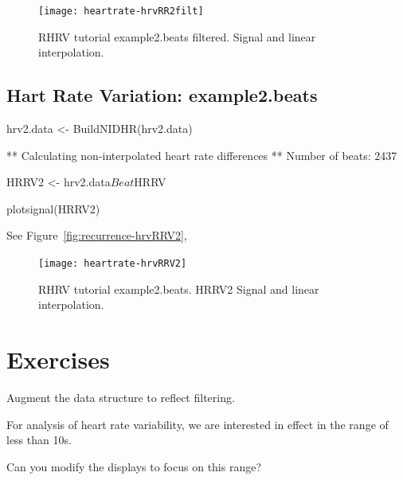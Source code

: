 \documentclass[a4paper, english, utf8]{amsart}
\newcommand{\figref}[1]{Figure\ \vref{#1}}
\begin{document}
\begin{figure}[htbp]
\begin{center}
\texttt{[image: heartrate-hrvRR2filt]}
\caption{RHRV tutorial example2.beats filtered. Signal and linear interpolation.}
\label{fig:recurrence-hrvRRfilt}
\end{center}
\end{figure}


\subsection{Hart Rate Variation: example2.beats}



\begin{Schunk}
\begin{Sinput}
  hrv2.data <- BuildNIDHR(hrv2.data)
\end{Sinput}
\begin{Soutput}
** Calculating non-interpolated heart rate differences **
   Number of beats: 2437 
\end{Soutput}
\begin{Sinput}
  HRRV2 <- hrv2.data$Beat$HRRV
\end{Sinput}
\end{Schunk}


\begin{Schunk}
\begin{Sinput}
  plotsignal(HRRV2)
\end{Sinput}
\end{Schunk}
See \figref{fig:recurrence-hrvRRV2},

\begin{figure}[htbp]
\begin{center}
\texttt{[image: heartrate-hrvRRV2]}
\caption{RHRV tutorial example2.beats. HRRV2 Signal and linear interpolation.}
\label{fig:recurrence-hrvRRV2}
\end{center}
\end{figure}

\section{Exercises}
\begin{exca}
Augment the data structure to reflect filtering.
\end{exca}

\begin{exca}
For analysis of heart rate variability, we are interested in effect in the range of less than 10s.

Can you modify the displays to focus on this range?
\end{exca}
\end{document}
